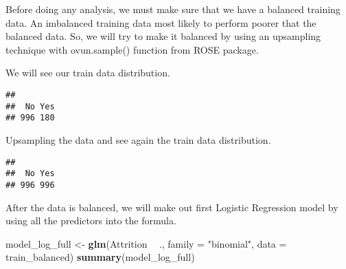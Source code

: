 \documentclass[
]{article}
\newenvironment{Shaded}{\begin{snugshade}}{\end{snugshade}}
\newcommand{\DataTypeTok}[1]{\textcolor[rgb]{0.13,0.29,0.53}{#1}}
\newcommand{\DecValTok}[1]{\textcolor[rgb]{0.00,0.00,0.81}{#1}}
\newcommand{\KeywordTok}[1]{\textcolor[rgb]{0.13,0.29,0.53}{\textbf{#1}}}
\newcommand{\NormalTok}[1]{#1}
\newcommand{\OperatorTok}[1]{\textcolor[rgb]{0.81,0.36,0.00}{\textbf{#1}}}
\newcommand{\StringTok}[1]{\textcolor[rgb]{0.31,0.60,0.02}{#1}}
\begin{document}
Before doing any analysis, we must make sure that we have a balanced
training data. An imbalanced training data most likely to perform poorer
that the balanced data. So, we will try to make it balanced by using an
upsampling technique with ovun.sample() function from ROSE package.

We will see our train data distribution.

\begin{Shaded}
\end{Shaded}

\begin{verbatim}
## 
##  No Yes 
## 996 180
\end{verbatim}

Upsampling the data and see again the train data distribution.

\begin{Shaded}
\end{Shaded}

\begin{verbatim}
## 
##  No Yes 
## 996 996
\end{verbatim}

After the data is balanced, we will make out first Logistic Regression
model by using all the predictors into the formula.

\begin{Shaded}
\begin{Highlighting}[]
\NormalTok{model_log_full <-}\StringTok{ }\KeywordTok{glm}\NormalTok{(Attrition }\OperatorTok{~}\StringTok{ }\NormalTok{., }\DataTypeTok{family =} \StringTok{"binomial"}\NormalTok{, }\DataTypeTok{data =}\NormalTok{ train_balanced)}
\KeywordTok{summary}\NormalTok{(model_log_full)}
\end{Highlighting}
\end{Shaded}
\end{document}
